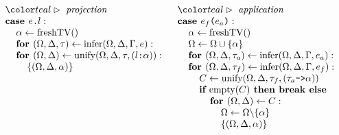 \documentclass[acmsmall]{acmart}
\begin{document}
\begin{figure*}[h]
\[\begin{array}[t]{@{} l}
    \I \C{projection}
    \\
    \I \B{case } \code{$e$.$l$} :  
    \\
    \I\I \alpha \leftarrow \F{freshTV}()
    \\
    \I\I \B{for } (\Omega, \Delta, \tau) \leftarrow \F{infer}(\Omega, \Delta, \Gamma, e):
    \\
    \I\I \B{for } (\Omega, \Delta) \leftarrow \F{unify}(\Omega, \Delta, \tau, (\code{$l$:$\alpha$})):
    \\
    \I\I\I \{(\Omega, \Delta, \alpha)\}
\end{array}
\begin{array}[t]{@{} l}
    \I \C{application}
    \\
    \I \B{case } \code{$e_f$($e_a$)} :  
    \\
    \I\I \alpha \leftarrow \F{freshTV}()
    \\
    \I\I \Omega \leftarrow \Omega \cup \{\alpha\}
    \\
    \I\I \B{for } (\Omega, \Delta, \tau_a) \leftarrow \F{infer}(\Omega, \Delta, \Gamma, e_a):
    \\
    \I\I \B{for } (\Omega, \Delta, \tau_f) \leftarrow \F{infer}(\Omega, \Delta, \Gamma, e_f):
    \\
    \I\I\I C \leftarrow \F{unify}(\Omega, \Delta, \tau_f, (\code{$\tau_a$->$\alpha$}))
    \\
    \I\I\I \B{if } \F{empty}(C) \B{ then } \B{break} \B{ else }
    \\
    \I\I\I\I \B{for } (\Omega, \Delta) \leftarrow C:
    \\
    \I\I\I\I\I \Omega \leftarrow \Omega \backslash \{\alpha\}
    \\
    \I\I\I\I\I \{(\Omega, \Delta, \alpha)\}

    \\


\end{array}\]
\end{figure*}
\end{document}
